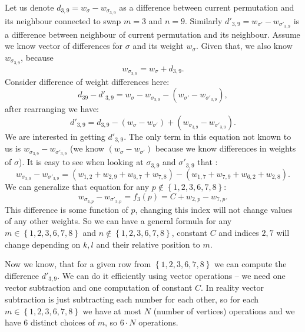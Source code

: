 		Let us denote $d_{3,9} = w_{\sigma} - w_{\sigma_{3,9}}$ as a difference between current permutation and its neighbour connected to swap  $m=3$ and $n=9$. Similarly $d'_{3,9} = w_{\sigma'} - w_{\sigma'_{3,9}}$ is a difference between neighbour of current permutation and its neighbour. Assume we know vector of differences for $\sigma$ and its weight $w_\sigma$. Given that, we also know $w_{\sigma_{3,9}}$, because
		\begin{equation*}
			w_{\sigma_{3,9}} = w_\sigma + d_{3,9}.
		\end{equation*}
		Consider difference of weight differences here:
		\begin{equation*}
			d_{39} - d'_{3,9} = w_{\sigma} - w_{\sigma_{3,9}} - (w_{\sigma'} - w_{\sigma'_{3,9}}),
		\end{equation*}
		after rearranging we have:
		\begin{equation*}
			d'_{3,9} = d_{3,9} - (w_{\sigma} - w_{\sigma'}) + (w_{\sigma_{3,9}} - w_{\sigma'_{3,9}}).
		\end{equation*}
		We are interested in getting $d'_{3,9}$. The only term in this equation not known to us is $w_{\sigma_{3,9}} - w_{\sigma'_{3,9}}$ (we know $(w_{\sigma} - w_{\sigma'})$ because we know differences in weights of $\sigma$). It is easy to see when looking at $\sigma_{3,9}$ and $\sigma'_{3,9}$ that :
		\begin{equation*}
			w_{\sigma_{3,9}} - w_{\sigma'_{3,9}} = (w_{1,2} + w_{2,9} + w_{6,7} + w_{7,8}) - (w_{1,7} + w_{7,9} + w_{6,2} + w_{2,8}).
		\end{equation*}
		We can generalize that equation for any $p \notin \left\{ 1,2,3,6,7,8 \right\}$:
		\begin{equation*}
			w_{\sigma_{3,p}} - w_{\sigma'_{3,p}} = f_3(p) = C + w_{2,p} - w_{7,p}.
		\end{equation*}
		This difference is some function of $p$, changing this index will not change values of any other weights. So we can have a general formula for any $m \in \left\{ 1,2,3,6,7,8 \right\}$ and $n \notin \left\{ 1,2,3,6,7,8 \right\}$, constant $C$ and indices $2,7$ will change depending on $k,l$ and their relative position to $m$.
		
		Now we know, that for a given row from $\left\{ 1,2,3,6,7,8 \right\}$ we can compute the difference $d'_{3,9}$. We can do it efficiently using vector operations -- we need one vector subtraction and one computation of constant $C$. In reality vector subtraction is just subtracting each number for each other, so for each $m \in \left\{ 1,2,3,6,7,8 \right\}$ we have at most $N$ (number of vertices) operations and we have $6$ distinct choices of $m$, so $6\cdot N$ operations.
	
